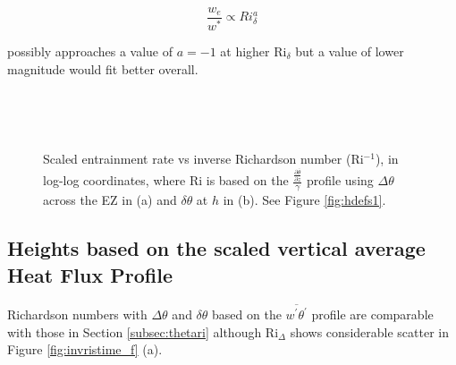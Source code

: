 \begin{equation}
\frac{w_{e}}{w^{*}} \propto Ri_{\delta}^{a}
\end{equation}

possibly approaches a value of $a = -1$ at higher \acs{Ri}$_{\delta}$ but a value of lower magnitude would fit better overall. \\    

\begin{figure}[htbp]
\begin{minipage}[b]{0.5\linewidth}
        \\
        \end{minipage}             
\quad
\begin{minipage}[b]{0.5\linewidth}
        \\       
       \end{minipage}
        \caption[Scaled Entrainment Rate vs inverse Richardson Number (i)]{Scaled entrainment rate vs inverse Richardson number (\acs{Ri}$^{-1}$), in log-log coordinates, where \acs{Ri} is based on the $\frac{\frac{\partial \overline{\theta}}{\partial z}}{\gamma}$ profile using $\Delta \theta$ across the \acs{EZ} in (a) and $\delta \theta$ at $h$ in (b). See Figure \ref{fig:hdefs1}.}
        \label{fig:weinvri}
\end{figure}

\clearpage

\subsection{Heights based on the scaled vertical average Heat Flux Profile}

Richardson numbers with $\Delta \theta$ and $\delta \theta$ based on the $\overline{w^{'}\theta^{'}}$ profile are comparable with those in Section \ref{subsec:thetari} although \acs{Ri}$_{\Delta}$ shows considerable scatter in Figure \ref{fig:invristime_f} (a).

